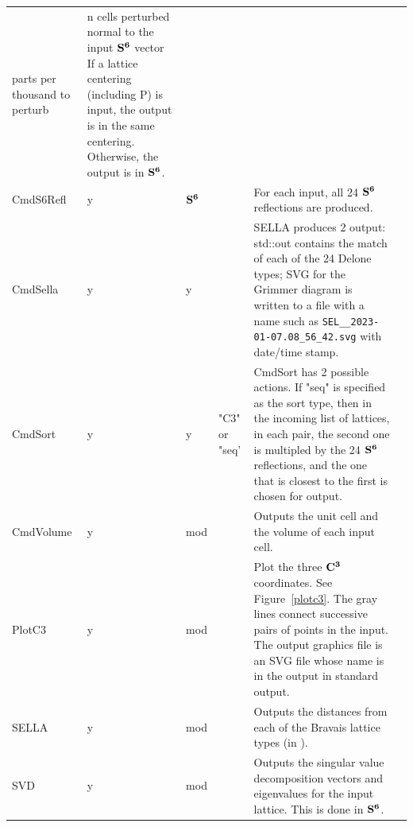 \documentclass[preprint]{iucr}              %
\numberwithin{equation}{section}
\newcommand{\SVI}[0]{$\bf{S^{6}}$}
\newcommand{\CIII}[0]{$\bf{C^{3}}$}
\begin{document}
\begin{longtable}{l l l p{} p{} l}
				parts per thousand to perturb			&
				n cells perturbed normal to the input \SVI{} vector
				If a lattice centering (including P) is input,
				the output is in the same centering. Otherwise, the output is in \SVI{}.	\\[.9pt]
			CmdS6Refl	&	y	&	\SVI{}	&\hrulefill	&	For each input, 
				all 24 \SVI{} reflections are produced.\\[.9pt]
			CmdSella	&	y	&	y		&\hrulefill	&
				SELLA produces 2 output: std::out contains the match of
				each of the 24 Delone types; SVG for the Grimmer
				diagram is written to a file with a name such as 
					\verb#SEL__2023-01-07.08_56_42.svg# with date/time stamp.\\
			CmdSort		&	y	&	y		&"C3" or "seq'&	CmdSort has 2 possible actions. If "seq" is specified
			as the sort type, then in the incoming list of 
			lattices, in each pair, the second one is multipled by the 24 \SVI{} reflections, and the one that
			is closest to the first is chosen for output.\\[.9pt]
			CmdVolume	&	y	&	mod		&\hrulefill	&		Outputs the unit cell 
				and the volume of each input cell.\\[.9pt]
			PlotC3		&	y	&	mod		& \hrulefill	& Plot 
				the three \CIII{} coordinates. See Figure~\ref{plotc3}. The gray lines
				connect successive pairs of points 
				in the input. The output graphics file
				is an SVG file whose name is in the output
				in standard output.\\[.9pt]
			SELLA		&	y	&	mod		&\hrulefill	&	
				Outputs the distances from each of the Bravais lattice types 
				(in \svi{}).	\\[.9pt]
			SVD			&	y	&	mod		&\hrulefill	& Outputs the singular value decomposition vectors
				and eigenvalues for the input lattice. This is done in \SVI{}.		\\[.9pt]			
			\bottomrule
			
		\end{longtable}
	
\end{document}
